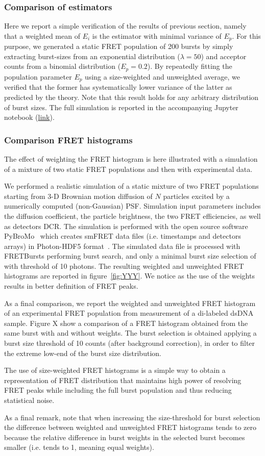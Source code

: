 \subsubsection{Comparison of estimators}
Here we report a simple verification of the results of previous section, namely
that a weighted mean of $E_i$ is the estimator with minimal variance of $E_p$.
For this purpose, we generated a static FRET population of 200 bursts 
by simply extracting burst-sizes from an exponential distribution ($\lambda = 50$)
and acceptor counts from a binomial distribution ($E_p = 0.2$). 
By repeatedly fitting the population parameter $E_p$ using a 
size-weighted and unweighted average, we verified that the former has systematically
lower variance of the latter as predicted by the theory. Note that this result
holds for any arbitrary distribution of burst sizes. The full simulation is reported in
the accompanying Jupyter notebook (\href{}{link}).

\subsubsection{Comparison FRET histograms}
The effect of weighting the FRET histogram is here illustrated with a simulation of
a mixture of two static FRET populations and then with experimental data.

We performed a realistic simulation of a static mixture of two FRET populations
starting from 3-D Brownian motion diffusion of $N$ particles excited by a 
numerically computed (non-Gaussian) PSF. Simulation input parameters includes
the diffusion coefficient, the particle brightness, the two FRET efficiencies,
as well as detectors DCR. The simulation is performed with the open source software 
PyBroMo~\cite{Ingargiola_2016} which creates smFRET data files (i.e. timestamps 
and detectors arrays) in Photon-HDF5 format~\cite{Ingargiola2016}.
The simulated data file is processed with FRETBursts performing burst search, 
and only a minimal burst size selection of with threshold of 10 photons.
The resulting weighted and unweighted FRET histograms are reported in figure~\ref{fig:YYY}.
We notice as the use of the weights results in better definition of FRET peaks.

As a final comparison, we report the weighted and unweighted FRET histogram of 
an experimental FRET population from measurement of a di-labeled dsDNA sample.
Figure X show a comparison of a FRET histogram obtained from the same burst
with and without weights. The burst selection is obtained applying a burst size
threshold of 10 counts (after background correction), in order to filter 
the extreme low-end of the burst size distribution.

The use of size-weighted FRET histograms is a simple way to obtain a representation of FRET 
distribution that maintains high power of resolving FRET peaks while including the full burst
population and thus reducing statistical noise.

As a final remark, note that when increasing the size-threshold for burst selection
the difference between weighted and unweighted FRET histograms tends to zero because
the relative difference in burst weights in the selected burst becomes smaller 
(i.e. tends to 1, meaning equal weights).